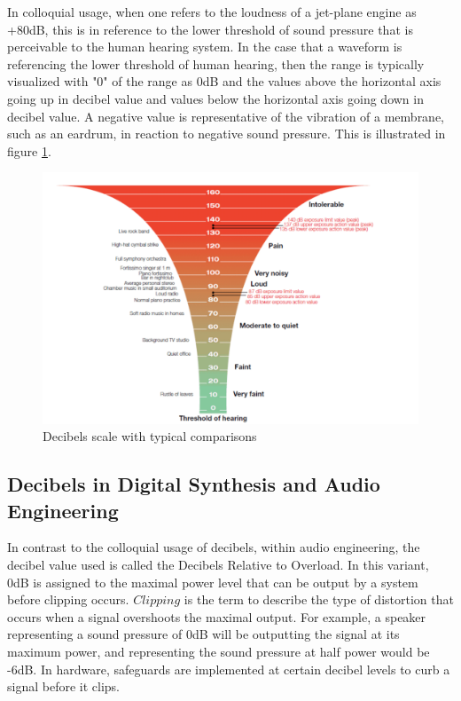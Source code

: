 \documentclass[a4paper,12pt]{report}
\begin{document}
In colloquial usage, when one refers to the loudness of a jet-plane engine as +80dB, this is in reference to the lower threshold of sound pressure that is perceivable to the human hearing system. In the case that a waveform is referencing the lower threshold of human hearing, then the range is typically visualized with "0" of the range as 0dB and the values above the horizontal axis going up in decibel value and values below the horizontal axis going down in decibel value. A negative value is representative of the vibration of a membrane, such as an eardrum, in reaction to negative sound pressure. This is illustrated in figure \ref{fig:decibelsscale}.

\begin{figure}
    \centering
    \includegraphics[width=36em]{DecibelsScale.png}
    \caption{Decibels scale with typical comparisons}
    \label{fig:decibelsscale}
\end{figure}

\subsection{Decibels in Digital Synthesis and Audio Engineering}
\label{subsec:decibelindigitalsynthesis}
In contrast to the colloquial usage of decibels, within audio engineering, the decibel value used is called the Decibels Relative to Overload.  In this variant, 0dB is assigned to the maximal power level that can be output by a system before clipping occurs. $Clipping$ is the term to describe the type of distortion that occurs when a signal overshoots the maximal output. For example, a speaker representing a sound pressure of 0dB will be outputting the signal at its maximum power, and representing the sound pressure at half power would be -6dB. In hardware, safeguards are implemented at certain decibel levels to curb a signal before it clips.
\end{document}
